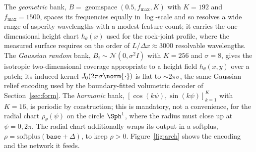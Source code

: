 The \emph{geometric} bank, $B=\operatorname{geomspace}(0.5,f_{\max},K)$ with $K=192$ and $f_{\max}=1500$,
spaces its frequencies equally in $\log$-scale and so resolves a wide range of asperity wavelengths with a
modest feature count; it carries the one-dimensional height chart $h_\theta(x)$ used for the rock-joint
profile, where the measured surface requires on the order of $L/\Delta x\approx 3000$ resolvable
wavelengths.
The \emph{Gaussian random} bank, $B_i\sim\mathcal N(0,\sigma^2 I)$ with $K=256$ and $\sigma=8$, gives the
isotropic two-dimensional coverage appropriate to a height field $h_\theta(x,y)$ over a patch; its induced
kernel $J_0(2\pi\sigma\norm{\cdot})$ is flat to $\sim 2\pi\sigma$, the same Gaussian-relief encoding used by
the boundary-fitted volumetric decoder of Section~\ref{sec:form}.
The \emph{harmonic} bank, $[\cos(k\psi),\sin(k\psi)]_{k=1}^{K}$ with $K=16$, is periodic by construction;
this is mandatory, not a convenience, for the radial chart $\rho_\theta(\psi)$ on the circle
$\Sph^1$, where the radius must close up at $\psi=0,2\pi$. The radial chart additionally wraps its output in
a softplus, $\rho=\mathrm{softplus}(\mathtt{base}+\Delta)$, to keep $\rho>0$. Figure~\ref{fig:arch} shows
the encoding and the network it feeds.

